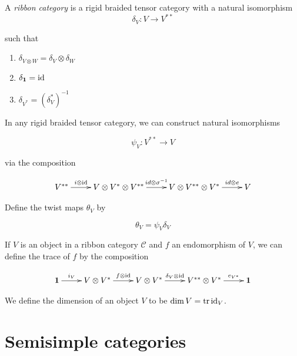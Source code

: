 \begin{defn}

    A \emph{ribbon category} is a rigid braided tensor category with a natural
    isomorphism
    \begin{equation}
        \delta_V: V \to V^{**}
    \end{equation}

such that 
\begin{enumerate}
    \renewcommand{\labelenumi}{\roman{enumi})}

    \item $\delta_{V \otimes W} = \delta_V \otimes \delta_W$
    \item $\delta_{\mathbf{1}} = \operatorname{id}$
    \item $\delta_{V^*} = (\delta_V^*)^{-1}$
\end{enumerate}

\end{defn}

In any rigid braided tensor category, we can construct natural isomorphisms 

\begin{equation}
\psi_V: V^{**} \to V
\end{equation}

via the composition

\begin{equation}
\xymatrix{
    V^{**} \ar[r]^-{i \otimes \id} & V \otimes V^* \otimes V^{**} \ar[r]^-{id \otimes \sigma^{-1}} & V \otimes V^{**} \otimes V^* \ar[r]^-{id \otimes e} &  V
    }
\end{equation}

Define the twist maps $\theta_V$ by

\begin{equation}
\theta_V = \psi_V \delta_V
\end{equation}

If $V$ is an object in a ribbon category $\mathcal{C}$ and $f$ an endomorphism
of $V$, we can define the trace of $f$ by the composition

\begin{equation}
    \xymatrix{
    \one \ar[r]^-{i_V} & V \otimes V^* \ar[r]^-{f \otimes \id} & V \otimes V^* \ar[r]^-{\delta_V \otimes \id} & V^{**} \otimes V^* \ar[r]^-{e_{V^*}} & 
    \one
    }
\end{equation}

We define the dimension of an object $V$ to be $\dim V = \operatorname{tr} \operatorname{id}_V$.

\section{Semisimple categories}

